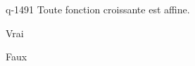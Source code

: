 \begin{truefalse}{q-1491}
Toute fonction croissante est affine.
\item Vrai
\item* Faux
\end{truefalse}

